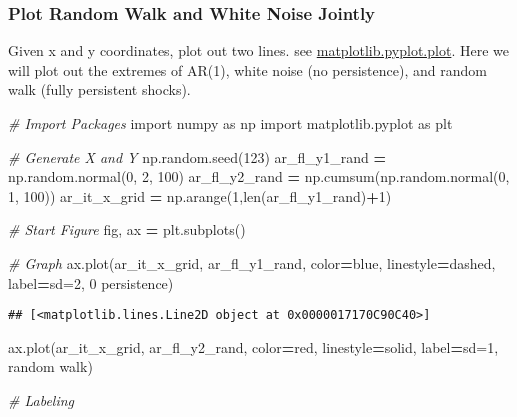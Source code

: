 \documentclass[
]{book}
\newenvironment{Shaded}{\begin{snugshade}}{\end{snugshade}}
\newcommand{\BuiltInTok}[1]{#1}
\newcommand{\CommentTok}[1]{\textcolor[rgb]{0.56,0.35,0.01}{\textit{#1}}}
\newcommand{\DecValTok}[1]{\textcolor[rgb]{0.00,0.00,0.81}{#1}}
\newcommand{\ImportTok}[1]{#1}
\newcommand{\NormalTok}[1]{#1}
\newcommand{\OperatorTok}[1]{\textcolor[rgb]{0.81,0.36,0.00}{\textbf{#1}}}
\newcommand{\StringTok}[1]{\textcolor[rgb]{0.31,0.60,0.02}{#1}}
\begin{document}
\hypertarget{plot-random-walk-and-white-noise-jointly}{%
\subsubsection{Plot Random Walk and White Noise Jointly}\label{plot-random-walk-and-white-noise-jointly}}

Given x and y coordinates, plot out two lines. see \href{https://matplotlib.org/2.1.1/api/_as_gen/matplotlib.pyplot.plot.html}{matplotlib.pyplot.plot}. Here we will plot out the extremes of AR(1), white noise (no persistence), and random walk (fully persistent shocks).

\begin{Shaded}
\begin{Highlighting}[]
\CommentTok{\# Import Packages}
\ImportTok{import}\NormalTok{ numpy }\ImportTok{as}\NormalTok{ np}
\ImportTok{import}\NormalTok{ matplotlib.pyplot }\ImportTok{as}\NormalTok{ plt}

\CommentTok{\# Generate X and Y}
\NormalTok{np.random.seed(}\DecValTok{123}\NormalTok{)}
\NormalTok{ar\_fl\_y1\_rand }\OperatorTok{=}\NormalTok{ np.random.normal(}\DecValTok{0}\NormalTok{, }\DecValTok{2}\NormalTok{, }\DecValTok{100}\NormalTok{)}
\NormalTok{ar\_fl\_y2\_rand }\OperatorTok{=}\NormalTok{ np.cumsum(np.random.normal(}\DecValTok{0}\NormalTok{, }\DecValTok{1}\NormalTok{, }\DecValTok{100}\NormalTok{))}
\NormalTok{ar\_it\_x\_grid }\OperatorTok{=}\NormalTok{ np.arange(}\DecValTok{1}\NormalTok{,}\BuiltInTok{len}\NormalTok{(ar\_fl\_y1\_rand)}\OperatorTok{+}\DecValTok{1}\NormalTok{)}

\CommentTok{\# Start Figure}
\NormalTok{fig, ax }\OperatorTok{=}\NormalTok{ plt.subplots()}

\CommentTok{\# Graph}
\NormalTok{ax.plot(ar\_it\_x\_grid, ar\_fl\_y1\_rand,}
\NormalTok{                     color}\OperatorTok{=}\StringTok{\textquotesingle{}blue\textquotesingle{}}\NormalTok{, linestyle}\OperatorTok{=}\StringTok{\textquotesingle{}dashed\textquotesingle{}}\NormalTok{,}
\NormalTok{                     label}\OperatorTok{=}\StringTok{\textquotesingle{}sd=2, 0 persistence\textquotesingle{}}\NormalTok{)}
\end{Highlighting}
\end{Shaded}

\begin{verbatim}
## [<matplotlib.lines.Line2D object at 0x0000017170C90C40>]
\end{verbatim}

\begin{Shaded}
\begin{Highlighting}[]
\NormalTok{ax.plot(ar\_it\_x\_grid, ar\_fl\_y2\_rand,}
\NormalTok{                     color}\OperatorTok{=}\StringTok{\textquotesingle{}red\textquotesingle{}}\NormalTok{, linestyle}\OperatorTok{=}\StringTok{\textquotesingle{}solid\textquotesingle{}}\NormalTok{,}
\NormalTok{                     label}\OperatorTok{=}\StringTok{\textquotesingle{}sd=1, random walk\textquotesingle{}}\NormalTok{)}
                     
\CommentTok{\# Labeling}
\end{Highlighting}
\end{Shaded}
\end{document}
